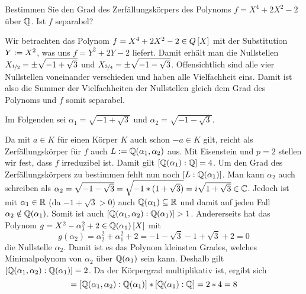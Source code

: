 \begin{exercisePage}
	
	\setcounter{taskcount}{37}
	
	\begin{homework}
		Bestimmen Sie den Grad des Zerfällungskörpers des Polynoms $f = X^4 + 2X^2 - 2$ über $\mathbb{Q}$. Ist $f$ separabel?
	\end{homework}
	
	Wir betrachten das Polynom $f = X^4 + 2X^2 -2 \in \polynom[Q]$ mit der Substitution $Y \mathrel{:=} X^2$, was uns $f = Y^2 + 2Y - 2$ liefert. Damit erhält man die Nullstellen $X_{\lfrac{1}{2}} = \pm \sqrt{-1 + \sqrt{3}}$ und $X_{\lfrac{3}{4}} = \pm \sqrt{-1 - \sqrt{3}}$. Offensichtlich sind alle vier Nullstellen voneinander verschieden und haben alle Vielfachheit eins. Damit ist also die Summer der Vielfachheiten der Nullstellen gleich dem Grad des Polynoms und $f$ somit separabel.
	
	Im Folgenden sei $\alpha_1 = \sqrt{-1 + \sqrt{3}}$ und $\alpha_2 = \sqrt{-1 - \sqrt{3}}$.
	
	Da mit $a \in K$ für einen Körper $K$ auch schon $-a \in K$ gilt, reicht als Zerfällungskörper für $f$ auch $L \mathrel{:=} \mathbb{Q}(\alpha_1, \alpha_2)$ aus. Mit Eisenstein und $p=2$ stellen wir fest, dass $f$ irreduzibel ist. Damit gilt $[\mathbb{Q}(\alpha_1) : \mathbb{Q}] = 4$. Um den Grad des Zerfällungskörpers zu bestimmen fehlt nun noch $[L : \mathbb{Q}(\alpha_1)]$. Man kann $\alpha_2$ auch schreiben als $\alpha_2 = \sqrt{-1 - \sqrt{3}} = \sqrt{-1 * (1 + \sqrt{3})} = i \sqrt{1 + \sqrt{3}} \in \mathbb{C}$. Jedoch ist mit $\alpha_1 \in \mathbb{R}$ (da $-1 + \sqrt{3} > 0$) auch $\mathbb{Q}(\alpha_1) \subseteq \mathbb{R}$ und damit auf jeden Fall $\alpha_2 \notin \mathbb{Q}(\alpha_1)$. Somit ist auch $[\mathbb{Q}(\alpha_1,\alpha_2) : \mathbb{Q}(\alpha_1)] > 1$. Andererseits hat das Polynom $g = X^2 - \alpha_1^2 + 2 \in \polynom[\Q(\alpha_1)]$ mit  
	\begin{equation*}
		g(\alpha_2) = \alpha_2^2 + \alpha_1^2 + 2 = -1 - \sqrt{3} - 1 + \sqrt{3} + 2 = 0
	\end{equation*}
	die Nullstelle $\alpha_2$. Damit ist es das Polynom kleinsten Grades, welches Minimalpolynom von $\alpha_2$ über $\mathbb{Q}(\alpha_1)$ sein kann. Deshalb gilt $[\mathbb{Q}(\alpha_1,\alpha_2) : \mathbb{Q}(\alpha_1)] = 2$. Da der Körpergrad multiplikativ ist, ergibt sich
	\begin{equation*}
		[L : \Q] = [\Q(\alpha_1,\alpha_2) : \Q(\alpha_1)] * [\Q(\alpha_1) : \Q] = 2 * 4 = 8
	\end{equation*}
	

\end{exercisePage}
